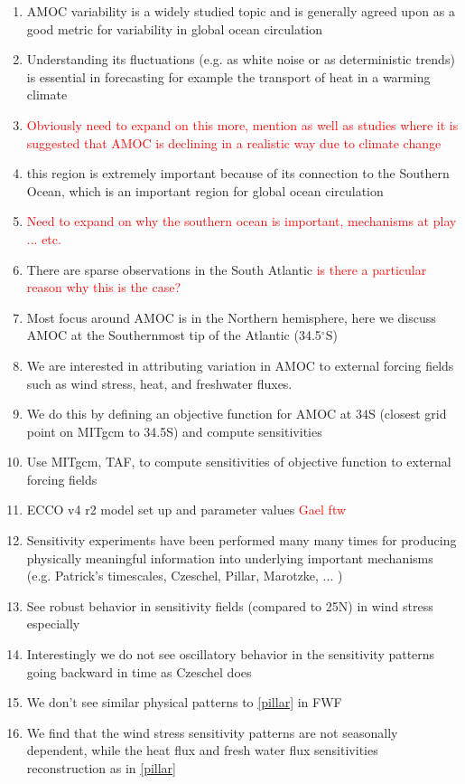 \documentclass[a4paper,11pt]{article}
\newcommand{\red}[1]{\textcolor{red}{#1}}
\begin{document}
	\begin{enumerate} 

	  \item AMOC variability is a widely studied topic and is generally agreed upon as a good metric for variability in global ocean circulation 
	  \item Understanding its fluctuations (e.g. as white noise or as deterministic trends) is essential in forecasting for example the transport of heat in a warming climate
	  \item \red{Obviously need to expand on this more, mention \cite{wunschAndHeimbach_AMOC} as well as studies where it is suggested that AMOC is declining in a realistic way due to climate change} 
	  \item this region is extremely important because of its connection to the Southern Ocean, which is an important region for global ocean circulation 
	  \item \red{Need to expand on why the southern ocean is important, mechanisms at play ... etc.}
	  \item There are sparse observations in the South Atlantic \red{is there a particular reason why this is the case?}
	  \item Most focus around AMOC is in the Northern hemisphere, here we discuss AMOC at the Southernmost tip of the Atlantic (34.5$^{\circ}$S)
	  \item We are interested in attributing variation in AMOC to external forcing fields such as wind stress, heat, and freshwater fluxes.
	  \item We do this by defining an objective function for AMOC at 34S (closest grid point on MITgcm to 34.5S) and compute sensitivities 
	  \item Use MITgcm, TAF, to compute sensitivities of objective function to external forcing fields
	  \item ECCO v4 r2 model set up and parameter values \red{Gael ftw}
	  \item Sensitivity experiments have been performed many many times for producing physically meaningful information into underlying important mechanisms (e.g. Patrick's timescales, Czeschel, Pillar, Marotzke, ... )
	  \item See robust behavior in sensitivity fields (compared to 25N) in wind stress especially 
	  \item Interestingly we do not see oscillatory behavior in the sensitivity patterns going backward in time as Czeschel does
	  \item We don't see similar physical patterns to \ref{pillar} in FWF
	  \item We find that the wind stress sensitivity patterns are not seasonally dependent, while the heat flux and fresh water flux sensitivities  reconstruction as in \ref{pillar}
 
	\end{enumerate} 
\end{document}
